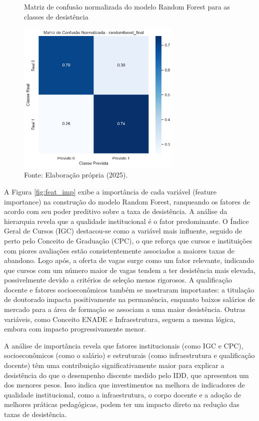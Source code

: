 \begin{figure}[H]
    \centering
    \caption{Matriz de confusão normalizada do modelo Random Forest para as classes de desistência}
    \label{fig:conf_matrix}
    \includegraphics[width=0.7\textwidth]{fig5_confusion_matrix.png}
    \caption*{Fonte: Elaboração própria (2025).}
\end{figure}

A Figura \ref{fig:feat_imp} exibe a importância de cada variável (feature importance) na construção do modelo Random Forest, ranqueando os fatores de acordo com seu poder preditivo sobre a taxa de desistência. A análise da hierarquia revela que a qualidade institucional é o fator predominante. O Índice Geral de Cursos (IGC) destacou-se como a variável mais influente, seguido de perto pelo Conceito de Graduação (CPC), o que reforça que cursos e instituições com piores avaliações estão consistentemente associados a maiores taxas de abandono.
Logo após, a oferta de vagas surge como um fator relevante, indicando que cursos com um número maior de vagas tendem a ter desistência mais elevada, possivelmente devido a critérios de seleção menos rigorosos. A qualificação docente e fatores socioeconômicos também se mostraram importantes: a titulação de doutorado impacta positivamente na permanência, enquanto baixos salários de mercado para a área de formação se associam a uma maior desistência. Outras variáveis, como Conceito ENADE e Infraestrutura, seguem a mesma lógica, embora com impacto progressivamente menor.

A análise de importância revela que fatores institucionais (como IGC e CPC), socioeconômicos (como o salário) e estruturais (como infraestrutura e qualificação docente) têm uma contribuição significativamente maior para explicar a desistência do que o desempenho discente medido pelo IDD, que apresentou um dos menores pesos. Isso indica que investimentos na melhora de indicadores de qualidade institucional, como a infraestrutura, o corpo docente e a adoção de melhores práticas pedagógicas, podem ter um impacto direto na redução das taxas de desistência.

